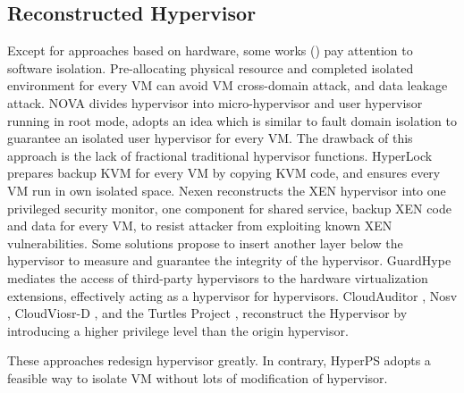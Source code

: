 \subsection{Reconstructed Hypervisor }
Except for approaches based on hardware, some works (\cite{shi2017deconstructing}\cite{shi2017deconstructing}\cite{hyperlock}) pay attention to software isolation. Pre-allocating physical resource and completed isolated environment for every VM can avoid VM cross-domain attack, and data leakage attack. NOVA\cite{shi2017deconstructing} divides hypervisor into micro-hypervisor and user hypervisor running in root mode, adopts an idea which is similar to fault domain isolation to guarantee an isolated user hypervisor for every VM. The drawback of this approach is the lack of fractional traditional hypervisor functions. HyperLock \cite{hyperlock} prepares backup KVM for every VM by copying KVM code, and ensures every VM run in own isolated space. 
Nexen\cite{shi2017deconstructing} reconstructs the XEN hypervisor into one privileged security monitor, one component for shared service, backup XEN code and data for every VM, to resist attacker from exploiting known XEN vulnerabilities.
Some solutions\cite{ben2010turtles,strackx2012fides} propose to insert another layer below the hypervisor to measure and guarantee the integrity of the hypervisor. GuardHype\cite{carbone2008taming} mediates the access of third-party hypervisors to the hardware virtualization extensions, effectively acting as a hypervisor for hypervisors. CloudAuditor \cite{Wang2016CloudAuditorAC}, Nosv \cite{REN2017137}, CloudViosr-D \cite{mi2020mostly}, and the Turtles Project \cite{183330}, reconstruct the Hypervisor by introducing a higher privilege level than the origin hypervisor. 

These approaches redesign hypervisor greatly. In contrary, HyperPS adopts a feasible way to isolate VM without lots of modification of hypervisor. 

